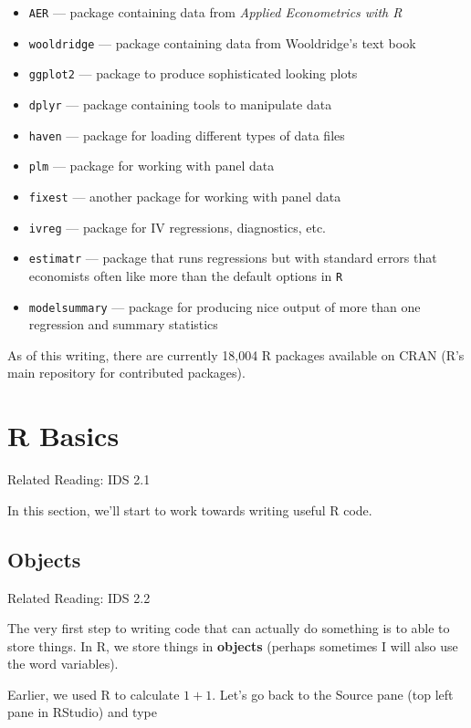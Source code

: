\documentclass[
  letterpaper,
  DIV=11,
  numbers=noendperiod]{scrreprt}
\begin{document}
\begin{itemize}
\item
  \texttt{AER} --- package containing data from \emph{Applied
  Econometrics with R}
\item
  \texttt{wooldridge} --- package containing data from Wooldridge's text
  book
\item
  \texttt{ggplot2} --- package to produce sophisticated looking plots
\item
  \texttt{dplyr} --- package containing tools to manipulate data
\item
  \texttt{haven} --- package for loading different types of data files
\item
  \texttt{plm} --- package for working with panel data
\item
  \texttt{fixest} --- another package for working with panel data
\item
  \texttt{ivreg} --- package for IV regressions, diagnostics, etc.
\item
  \texttt{estimatr} --- package that runs regressions but with standard
  errors that economists often like more than the default options in
  \texttt{R}
\item
  \texttt{modelsummary} --- package for producing nice output of more
  than one regression and summary statistics
\end{itemize}

As of this writing, there are currently 18,004 R packages available on
CRAN (R's main repository for contributed packages).

\section{R Basics}\label{r-basics}

Related Reading: IDS 2.1

In this section, we'll start to work towards writing useful R code.

\subsection{Objects}\label{objects}

Related Reading: IDS 2.2

The very first step to writing code that can actually do something is to
able to store things. In R, we store things in \textbf{objects} (perhaps
sometimes I will also use the word variables).

Earlier, we used R to calculate \(1+1\). Let's go back to the Source
pane (top left pane in RStudio) and type
\end{document}
